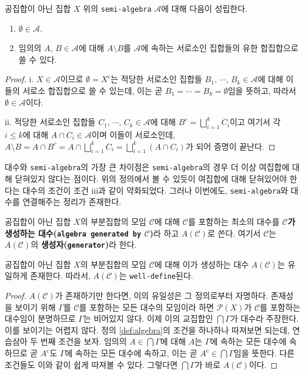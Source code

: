 \begin{proposition}\label{prop:semiAlgebra}
    공집합이 아닌 집합 $X$ 위의 \texttt{semi-algebra} $\mathcal{A}$에 대해 다음이 성립한다.
    \begin{enumerate}
        \item $\emptyset\in\mathcal{A}$.
        \item 임의의 $A,\,B\in\mathcal{A}$에 대해 $A\setminus B$를 $\mathcal{A}$에 속하는 서로소인 집합들의 유한 합집합으로 쓸 수 있다.
    \end{enumerate}
\end{proposition}

\begin{proof}
    i. $X\in\mathcal{A}$이므로 $\emptyset=X^c$는 적당한 서로소인 집합들 $B_1,\,\cdots,\,B_k\in\mathcal{A}$에 대해 이들의 서로소 합집합으로 쓸 수 있는데, 이는 곧 $B_1=\cdots=B_k=\emptyset$임을 뜻하고, 따라서 $\emptyset\in\mathcal{A}$이다.

    ii. 적당한 서로소인 집합들 $C_1,\,\cdots,\,C_k\in\mathcal{A}$에 대해 $B^c=\bigsqcup_{i=1}^kC_i$이고 여기서 각 $i\leq k$에 대해 $A\cap C_i\in\mathcal{A}$이며 이들이 서로소인데, $A\setminus B=A\cap B^c=A\cap\bigsqcup_{i=1}^kC_i=\bigsqcup_{i=1}^k(A\cap C_i)$가 되어 증명이 끝난다.
\end{proof}

대수와 \texttt{semi-algebra}의 가장 큰 차이점은 \texttt{semi-algebra}의 경우 더 이상 여집합에 대해 닫혀있지 않다는 점이다. 위의 정의에서 볼 수 있듯이 여집합에 대해 닫혀있어야 한다는 대수의 조건이 조건 iii과 같이 약화되었다. 그러나 이번에도, \texttt{semi-algebra}와 대수를 연결해주는 정리가 존재한다.

\begin{definition}
    공집합이 아닌 집합 $X$의 부분집합의 모임 $\mathcal{C}$에 대해 $\mathcal{C}$를 포함하는 최소의 대수를 \textbf{$\mathcal{C}$가 생성하는 대수(\texttt{algebra generated by} $\mathcal{C}$)}라 하고 $A(\mathcal{C})$로 쓴다. 여기서 $\mathcal{C}$는 $A(\mathcal{C})$의 \textbf{생성자(\texttt{generator})}라 한다.
\end{definition}

\begin{proposition}
    공집합이 아닌 집합 $X$의 부분집합의 모임 $\mathcal{C}$에 대해 이가 생성하는 대수 $A(\mathcal{C})$는 유일하게 존재한다. 따라서, $A(\mathcal{C})$는 \texttt{well-define}된다.
\end{proposition}

\begin{proof}
    $A(\mathcal{C})$가 존재하기만 한다면, 이의 유일성은 그 정의로부터 자명하다. 존재성을 보이기 위해 $\Gamma$를 $\mathcal{C}$를 포함하는 모든 대수의 모임이라 하면 $\mathcal{P}(X)$가 $\mathcal{C}$를 포함하는 대수임이 분명하므로 $\Gamma$는 비어있지 않다. 이제 이의 교집합인 $\bigcap\Gamma$가 대수라 주장한다. 이를 보이기는 어렵지 않다. 정의 \ref{def:algebra}의 조건을 하나하나 따져보면 되는데, 연습삼아 두 번째 조건을 보자. 임의의 $A\in\bigcap\Gamma$에 대해 $A$는 $\Gamma$에 속하는 모든 대수에 속하므로 곧 $A^c$도 $\Gamma$에 속하는 모든 대수에 속하고, 이는 곧 $A^c\in\bigcap\Gamma$임을 뜻한다. 다른 조건들도 이와 같이 쉽게 따져볼 수 있다. 그렇다면 $\bigcap\Gamma$가 바로 $A(\mathcal{C})$이다.
\end{proof}

